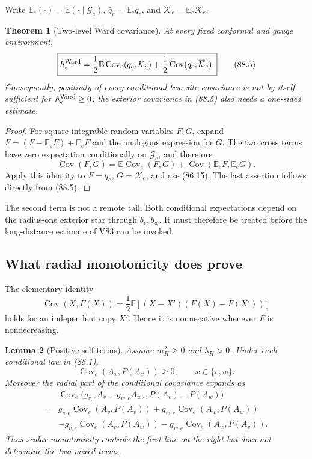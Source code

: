 \documentclass[11pt]{article}
\newtheorem{theorem}{Theorem}[section]
\newtheorem{lemma}[theorem]{Lemma}
\theoremstyle{remark}
\begin{document}
Write \(\mathbb E_e(\cdot)=\mathbb E(\cdot\mid\mathscr G_e)\),
\(\bar q_e=\mathbb E_eq_e\), and
\(\overline{\mathcal K}_e=\mathbb E_e\mathcal K_e\).

\begin{theorem}[Two-level Ward covariance]
\label{thm:v17v88-total-cov}
At every fixed conformal and gauge environment,
\[
\boxed{
 h_e^{\rm Ward}
 =\frac12\mathbb E\operatorname{Cov}_e(q_e,\mathcal K_e)
 +\frac12\operatorname{Cov}
       (\bar q_e,\overline{\mathcal K}_e).}          \tag{88.5}
\]
Consequently, positivity of every conditional two-site covariance is
not by itself sufficient for \(h_e^{\rm Ward}\geq0\); the exterior
covariance in (88.5) also needs a one-sided estimate.
\end{theorem}

\begin{proof}
For square-integrable random variables \(F,G\), expand
\(F=(F-\mathbb E_eF)+\mathbb E_eF\) and the analogous expression for
\(G\).  The two cross terms have zero expectation conditionally on
\(\mathscr G_e\), and therefore
\[
 \operatorname{Cov}(F,G)
 =\mathbb E\operatorname{Cov}_e(F,G)
  +\operatorname{Cov}(\mathbb E_eF,\mathbb E_eG).    \tag{88.6}
\]
Apply this identity to \(F=q_e\), \(G=\mathcal K_e\), and use
(86.15).  The last assertion follows directly from (88.5).
\end{proof}

The second term is not a remote tail.  Both conditional expectations
depend on the radius-one exterior star through \(b_v,b_w\).  It must
therefore be treated before the long-distance estimate of V83 can be
invoked.

\subsection{What radial monotonicity does prove}

The elementary identity
\[
 \operatorname{Cov}(X,F(X))
 =\frac12\mathbb E[(X-X')(F(X)-F(X'))]               \tag{88.7}
\]
holds for an independent copy \(X'\).  Hence it is nonnegative whenever
\(F\) is nondecreasing.

\begin{lemma}[Positive self terms]
\label{lem:v17v88-self}
Assume \(m_H^2\geq0\) and \(\lambda_H>0\).  Under each conditional law
in (88.1),
\[
 \operatorname{Cov}_e(A_x,P(A_x))\geq0,
 \qquad x\in\{v,w\}.                                \tag{88.8}
\]
Moreover the radial part of the conditional covariance expands as
\[
\begin{aligned}
 &\operatorname{Cov}_e
 \bigl(g_{v,e}A_v-g_{w,e}A_w,,P(A_v)-P(A_w)\bigr)\\
 ={}&g_{v,e}\operatorname{Cov}_e(A_v,P(A_v))
    +g_{w,e}\operatorname{Cov}_e(A_w,P(A_w))\\
 &-g_{v,e}\operatorname{Cov}_e(A_v,P(A_w))
  -g_{w,e}\operatorname{Cov}_e(A_w,P(A_v)).         \tag{88.9}
\end{aligned}
\]
Thus scalar monotonicity controls the first line on the right but does
not determine the two mixed terms.
\end{lemma}
\end{document}

